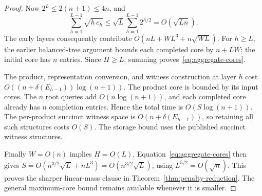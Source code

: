 \documentclass[11pt]{article}
\begin{document}
\begin{proof}
Now $2^L\le2(n+1)\le4n$, and
\[
 \sum_{h=1}^{L-1}\sqrt{h\,c_h}
 \le\sqrt L\sum_{h=1}^{L-1}2^{h/2}
 =O(\sqrt{Ln}).
\]
The early layers consequently contribute
$O(nL+WL^3+n\sqrt{WL})$. For $h\ge L$, the earlier balanced-tree
argument bounds each completed core by $n+LW$; the initial core has
$n$ entries. Since $H\ge L$, summing proves~\eqref{eq:aggregate-cores}.

The product, representation conversion, and witness construction at
layer $h$ cost $O((n+\delta(E_{h-1}))\log(n+1))$. The product core is
bounded by its input cores. The $n$ root queries add $O(n\log(n+1))$,
and each completed core already has $n$ completion entries. Hence the
total time is $O(S\log(n+1))$. The per-product succinct witness space
is $O(n+\delta(E_{h-1}))$, so retaining all such structures costs $O(S)$.
The storage bound uses the published succinct witness structures.

Finally $W=O(n)$ implies $H=O(L)$. Equation~\eqref{eq:aggregate-cores}
then gives $S=O(n^{3/2}\sqrt L+nL^3)=O(n^{3/2}\sqrt L)$, using
$L^{5/2}=O(\sqrt n)$. This proves the sharper linear-mass clause in
Theorem~\ref{thm:penalty-reduction}. The general maximum-core bound
remains available whenever it is smaller.
\end{proof}
\end{document}
